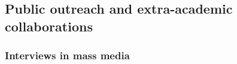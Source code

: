 \documentclass[a4paper,11pt,oneside]{article}
\begin{document}
{%



\subsection{Public outreach and extra-academic collaborations}

    \subsubsection{Interviews in mass media}

}
\end{document}

